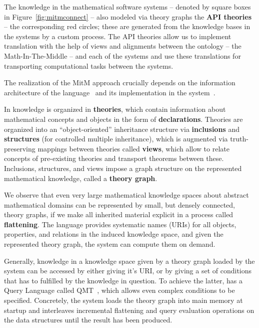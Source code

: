 The knowledge in the mathematical software systems -- denoted by square boxes in
Figure~\ref{fig:mitmconnect} -- also modeled via \ommt theory graphs the \textbf{API
  theories} -- the corresponding red circles; these are generated from the
knowledge bases in the systems by a custom process. The API theories allow us to implement
translation with the help of \ommt views and alignments between the ontology -- the
Math-In-The-Middle -- and each of the systems and use these translations for transporting
computational tasks between the systems. 

The realization of the MitM approach crucially depends on the information architecture of
the \ommt language~\cite{Kohlhase:OMDoc1.2,RabKoh:WSMSML13} and its implementation in the
\mmt system~\cite{Rabe:MAGMS13,uniformal:on}.

In \ommt knowledge is organized in \textbf{theories}, which contain information about
mathematical concepts and objects in the form of \textbf{declarations}. Theories are
organized into an ``object-oriented'' inheritance structure via \textbf{inclusions} and
\textbf{structures} (for controlled multiple inheritance), which is augmented via
truth-preserving mappings between theories called \textbf{views}, which allow to relate
concepts of pre-existing theories and transport theorems between these. Inclusions,
structures, and views impose a graph structure on the represented mathematical knowledge,
called a \textbf{theory graph}. 

We observe that even very large mathematical knowledge spaces about abstract mathematical
domains can be represented by small, but densely connected, theory graphs, if we make all
inherited material explicit in a process called \textbf{flattening}. The \ommt language
provides systematic names (\mmt URIs) for all objects, properties, and relations in the
induced knowledge space, and given the represented theory graph, the \mmt system can
compute them on demand. 

Generally, knowledge in a knowledge space given by a theory graph loaded by the \mmt
system can be accessed by either giving it's \mmt URI, or by giving a set of conditions
that has to fulfilled by the knowledge in question. To achieve the latter, \mmt has a
Query Language called QMT~\cite{Rabe:qlfml12}, which allows even complex conditions to be
specified. Concretely, the \mmt system loads the theory graph into main memory at startup
and interleaves incremental flattening and query evaluation operations on the \mmt data
structures until the result has been produced. 

